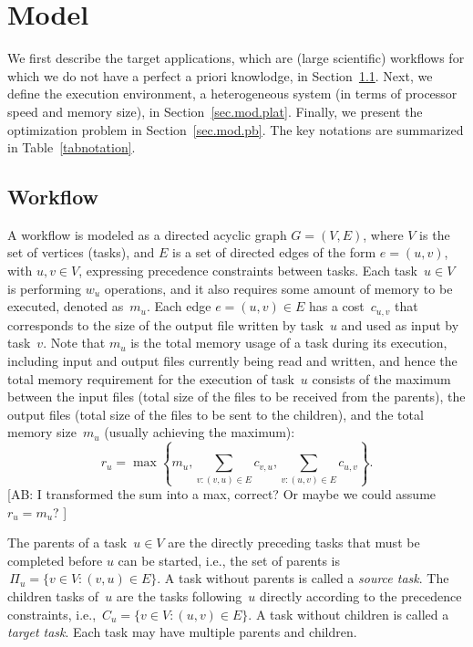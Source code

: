 \documentclass[conference]{IEEEtran}
\newcommand{\parents}[1]{\,\Pi_{#1}}
\newcommand{\children}[1]{\,C_{#1}}
\newcommand{\skug}[1]{{\color{blue}[SK: #1]}}
\newcommand{\AB}[1]{{\color{purple}[AB: #1]}}
\begin{document}
    \section{Model} %

    We first describe the target applications, which are (large scientific) workflows for which we
    do not have a perfect a priori knowlodge,
    in Section~\ref{sec.mod.work}.  Next, we define the execution
    environment, a heterogeneous system (in terms of processor speed and memory size),
    in Section~\ref{sec.mod.plat}. Finally, we present the optimization problem in
    Section~\ref{sec.mod.pb}. The key notations are summarized in Table~\ref{tabnotation}.

    \subsection{Workflow}
    \label{sec.mod.work}
    A workflow is modeled as a directed acyclic graph $G=(V, E)$, where $V$ is the set of vertices (tasks), and
    $E$ is a set of directed edges of the form $e=(u,v)$, with $u,v\in V$, expressing precedence constraints between tasks.
    Each task~$u \in V$  is performing $w_u$ operations, and it also
    requires some amount of memory to be executed, denoted as~$m_u$.
    Each edge $e=(u,v) \in E$ has a cost~$c_{u,v}$ that corresponds to the size of the output file written by task~$u$ and used as input by task~$v$.
   Note that $m_u$ is the total memory usage
    of a task during its execution, including input and output files currently being read and written,
    and hence the total memory requirement  for the execution of task~$u$ consists of the maximum
    between the input files
    (total size of the files to be received from the parents),
    the output files (total size of the files to be sent to the children),
    and the total memory size~$m_u$ (usually achieving the maximum):
    \[
        r_u = \max\left\{m_u , \sum_{v:(v,u)\in E}c_{v,u}, \sum_{v:(u,v)\in E} c_{u,v}\right\}.
    \]
\AB{I transformed the sum into a max, correct? Or maybe we could assume $r_u=m_u$? }

    The parents of a task~$u\in V$ are the directly preceding tasks that must be completed before $u$ can be started, i.e., the set of parents is
    $ \parents{u} = \{v \in V: (v,u) \in E\}$. A task without parents is called a {\it source task}.
    The children tasks of~$u$ are the tasks following~$u$ directly according to the precedence constraints, i.e.,
    $ \children{u} = \{v \in V: (u,v) \in E\}$. A task without children is called a {\it target task}.
    Each task may have multiple parents and children.
\end{document}
